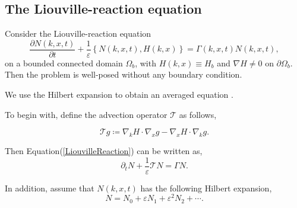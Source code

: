 \documentclass{article}
\numberwithin{equation}{section}
\begin{document}

\subsection{The Liouville-reaction equation}

Consider the Liouville-reaction equation 
\begin{equation}\label{LiouvilleReaction}
    \frac{\partial N(k,x,t)}{\partial t}+\frac{1}{\varepsilon}\left\{ N(k,x,t),H(k,x)\right\} =\Gamma(k,x,t)N(k,x,t),
\end{equation}
on a bounded connected domain $\Omega_{b}$, with $H(k,x) \equiv H_{b}$ and $\nabla H \neq 0 $ on $\partial \Omega_{b}$. Then the problem is well-posed without any boundary condition.





We use the Hilbert expansion to obtain an averaged equation \cite{bostan2010transport}.

To begin with, define the advection operator $\mathcal{T}$ as follows,

\begin{equation}
    \mathcal{T}g\coloneqq\nabla_{k}H\cdot\nabla_{x}g-\nabla_{x}H\cdot\nabla_{k}g.
\end{equation}

Then Equation(\ref{LiouvilleReaction}) can be written as,
\begin{equation}\label{adv-reaction}
    \partial_{t}N+\frac{1}{\varepsilon}\mathcal{T}N=\Gamma N.
\end{equation}

In addition, assume that $N(k,x,t)$ has the following Hilbert expansion,
\begin{equation}\label{HilbertExpansion}
    N=N_{0}+\varepsilon N_{1}+\varepsilon^{2}N_{2}+\cdots.
\end{equation}
\end{document}
